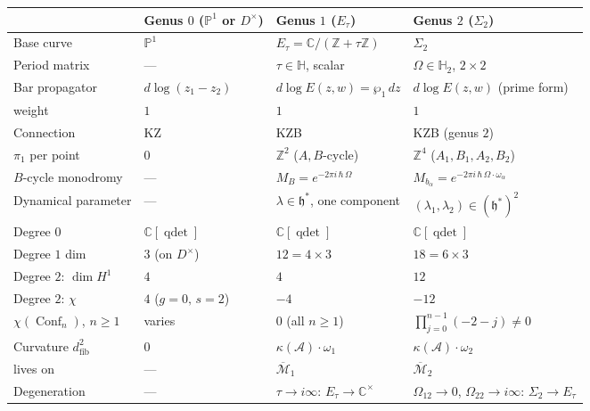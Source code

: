 \documentclass[11pt,reqno]{amsart}
\theoremstyle{definition}
\theoremstyle{remark}
\newcommand{\cA}{\mathcal{A}}
\newcommand{\cM}{\mathcal{M}}
\DeclareMathOperator{\Conf}{Conf}
\newcommand{\fh}{\mathfrak{h}}
\newcommand{\CC}{\mathbb{C}}
\newcommand{\ZZ}{\mathbb{Z}}
\newcommand{\PP}{\mathbb{P}}
\newcommand{\HHH}{\mathbb{H}}
\numberwithin{equation}{section}
\begin{document}
\begin{center}
\renewcommand{\arraystretch}{1.3}
\small
\begin{tabular}{@{} l l l l @{}}
\toprule
& Genus $0$ ($\PP^1$ or $D^\times$)
& Genus $1$ ($E_\tau$)
& Genus $2$ ($\Sigma_2$)
\\
\midrule
Base curve
  & $\PP^1$
  & $E_\tau = \CC/(\ZZ + \tau\ZZ)$
  & $\Sigma_2$
\\
Period matrix
  & ---
  & $\tau \in \HHH$, scalar
  & $\Omega \in \HHH_2$, $2 \times 2$
\\
Bar propagator
  & $d\log(z_1 - z_2)$
  & $d\log E(z,w) = \wp_1\,dz$
  & $d\log E(z,w)$ (prime form)
\\
\quad weight
  & $1$
  & $1$
  & $1$
\\
Connection
  & KZ
  & KZB
  & KZB (genus $2$)
\\
$\pi_1$ per point
  & $0$
  & $\ZZ^2$ ($A, B$-cycle)
  & $\ZZ^4$ ($A_1, B_1, A_2, B_2$)
\\
$B$-cycle monodromy
  & ---
  & $M_B = e^{-2\pi i\,\hbar\,\Omega}$
  & $M_{b_\alpha} = e^{-2\pi i\,\hbar\,
  \Omega \cdot \omega_\alpha}$
\\
Dynamical parameter
  & ---
  & $\lambda \in \fh^*$, one component
  & $(\lambda_1, \lambda_2) \in (\fh^*)^2$
\\
\midrule
Degree $0$
  & $\CC[\operatorname{qdet}]$
  & $\CC[\operatorname{qdet}]$
  & $\CC[\operatorname{qdet}]$
\\
Degree $1$ dim
  & $3$ (on $D^\times$)
  & $12 = 4 \times 3$
  & $18 = 6 \times 3$
\\
Degree $2$: $\dim H^1$
  & $4$
  & $4$
  & $12$
\\
Degree $2$: $\chi$
  & $4$ ($g=0,\,s=2$)
  & $-4$
  & $-12$
\\
$\chi(\Conf_n)$, $n \geq 1$
  & varies
  & $0$ (all $n \geq 1$)
  & $\prod_{j=0}^{n-1}(-2-j) \neq 0$
\\
Curvature $d_{\mathrm{fib}}^2$
  & $0$
  & $\kappa(\cA) \cdot \omega_1$
  & $\kappa(\cA) \cdot \omega_2$
\\
\quad lives on
  & ---
  & $\overline{\cM}_{1}$
  & $\overline{\cM}_{2}$
\\
Degeneration
  & ---
  & $\tau \to i\infty$: $E_\tau \to \CC^\times$
  & $\Omega_{12} \to 0$, $\Omega_{22} \to
  i\infty$: $\Sigma_2 \to E_\tau$
\\
\bottomrule
\end{tabular}
\end{center}
\end{document}
